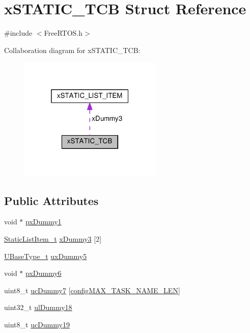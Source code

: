 \hypertarget{structx_s_t_a_t_i_c___t_c_b}{}\section{x\+S\+T\+A\+T\+I\+C\+\_\+\+T\+CB Struct Reference}
\label{structx_s_t_a_t_i_c___t_c_b}


{\ttfamily \#include $<$Free\+R\+T\+O\+S.\+h$>$}



Collaboration diagram for x\+S\+T\+A\+T\+I\+C\+\_\+\+T\+CB\+:\nopagebreak
\begin{figure}[H]
\begin{center}
\leavevmode
\includegraphics[width=193pt]{structx_s_t_a_t_i_c___t_c_b__coll__graph}
\end{center}
\end{figure}
\subsection*{Public Attributes}
\begin{DoxyCompactItemize}
\item 
void $\ast$ \hyperlink{structx_s_t_a_t_i_c___t_c_b_a2f66b620fdeb13f8969f27e1bbb4d1d1}{px\+Dummy1}
\item 
\hyperlink{_free_r_t_o_s_8h_a1d31bc0472385a87424518da484d9e09}{Static\+List\+Item\+\_\+t} \hyperlink{structx_s_t_a_t_i_c___t_c_b_a7f182aa8f5003494f63d975dabcb3ec1}{x\+Dummy3} \mbox{[}2\mbox{]}
\item 
\hyperlink{portmacro_8h_a646f89d4298e4f5afd522202b11cb2e6}{U\+Base\+Type\+\_\+t} \hyperlink{structx_s_t_a_t_i_c___t_c_b_ab950bb498901ef7291e49086e5a2efd0}{ux\+Dummy5}
\item 
void $\ast$ \hyperlink{structx_s_t_a_t_i_c___t_c_b_a416495e152e5caef64994f72329c60b0}{px\+Dummy6}
\item 
uint8\+\_\+t \hyperlink{structx_s_t_a_t_i_c___t_c_b_a308771ccd6723cad777695d84a0a2a30}{uc\+Dummy7} \mbox{[}\hyperlink{_free_r_t_o_s_config_8h_ac388dc4041aab6997348828eb27fc1a8}{config\+M\+A\+X\+\_\+\+T\+A\+S\+K\+\_\+\+N\+A\+M\+E\+\_\+\+L\+EN}\mbox{]}
\item 
uint32\+\_\+t \hyperlink{structx_s_t_a_t_i_c___t_c_b_ade6781276f913dcd592ee0f6cce76c7e}{ul\+Dummy18}
\item 
uint8\+\_\+t \hyperlink{structx_s_t_a_t_i_c___t_c_b_aa98151056a161f180013ae36dae0d17b}{uc\+Dummy19}
\end{DoxyCompactItemize}


